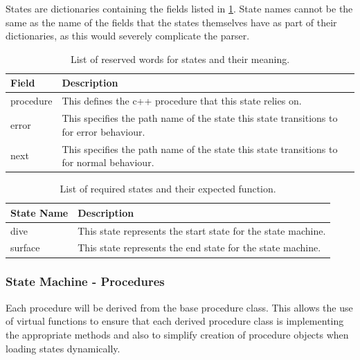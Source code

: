 States are dictionaries containing the fields listed in
\ref{tab:StateRequiredFields}. State names cannot be the same as the name of the
fields that the states themselves have as part of their dictionaries, as this
would severely complicate the parser.

\begin{table}[]
  \begin{tabular}{|l|l|}
    \hline
    Field & Description \\ \hline
    procedure & This defines the c++ procedure that this state relies on. \\ \hline
    error     & This specifies the path name of the state this state transitions to for error behaviour. \\ \hline
    next      & This specifies the path name of the state this state transitions to for normal behaviour. \\ \hline
  \end{tabular}
  \caption[State Reserved Words and Descriptions]{List of reserved words for states and their meaning.}
  \label{tab:StateRequiredFields}
\end{table}

\begin{table}[]
  \begin{tabular}{|l|l|}
    \hline
    State Name & Description \\ \hline
    dive & This state represents the start state for the state machine. \\ \hline
    surface & This state represents the end state for the state machine. \\ \hline
  \end{tabular}
  \caption[Required States and Descriptions]{List of required states and their expected function.}
  \label{tab:RequiredStateNames}
\end{table}

\subsubsection{State Machine - Procedures}

Each procedure will be derived from the base procedure class.
This allows the use of virtual functions to ensure that each derived procedure
class is implementing the appropriate methods and also to simplify creation of
procedure objects when loading states dynamically.

